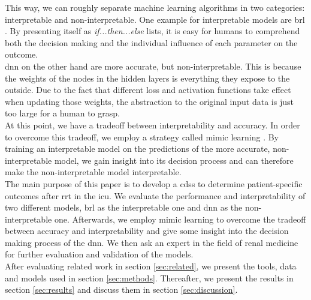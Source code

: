 \documentclass[conference,comsoc]{IEEEtran}
\begin{document}
This way, we can roughly separate machine learning algorithms in two categories: interpretable and non-interpretable. 
One example for interpretable models are \gls{brl} \cite{Letham2015}.
By presenting itself as \emph{if...then...else} lists, it is easy for humans to comprehend both the decision making and the individual influence of each parameter on the outcome. \\
\gls{dnn} on the other hand are more accurate, but non-interpretable.
This is because the weights of the nodes in the hidden layers is everything they expose to the outside.
Due to the fact that different loss and activation functions take effect when updating those weights, the abstraction to the original input data is just too large for a human to grasp. \\
At this point, we have a tradeoff between interpretability and accuracy.
In order to overcome this tradeoff, we employ a strategy called mimic learning \cite{Che2016}.
By training an interpretable model on the predictions of the more accurate, non-interpretable model, we gain insight into its decision process and can therefore make the non-interpretable model interpretable. \\

The main purpose of this paper is to develop a \gls{cdss} to determine patient-specific outcomes after \gls{rrt} in the \gls{icu}.
We evaluate the performance and interpretability of two different models, \gls{brl} as the interpretable one and \gls{dnn} as the non-interpretable one.
Afterwards, we employ mimic learning to overcome the tradeoff between accuracy and interpretability and give some insight into the decision making process of the \gls{dnn}.
We then ask an expert in the field of renal medicine for further evaluation and validation of the models. \\

After evaluating related work in section \ref{sec:related}, we present the tools, data and models used in section \ref{sec:methods}.
Thereafter, we present the results in section \ref{sec:results} and discuss them in section \ref{sec:discussion}.
\end{document}
